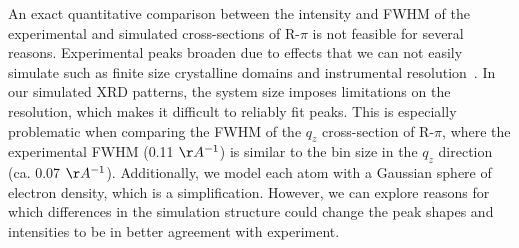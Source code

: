 \documentclass[journal=jpcbfk,manuscript=article]{achemso}
\begin{document}
  An exact quantitative comparison between the intensity and FWHM of the
  experimental and simulated cross-sections of R-$\pi$ is not feasible for
  several reasons. Experimental peaks broaden due to effects that we can not
  easily simulate such as finite size crystalline domains and instrumental %
  resolution~\cite{girolami_x-ray_2016}. In our simulated XRD patterns, 
  the system size imposes limitations
  on the resolution, which makes it difficult to reliably fit peaks. This is
  especially problematic when comparing the FWHM of the $q_z$ cross-section of
  R-$\pi$, where the experimental FWHM (0.11 $\AA^{-1}$) is similar to the bin
  size in the $q_z$ direction (ca. 0.07 $\AA^{-1}$).  Additionally, we model each
  atom with a Gaussian sphere of electron density, which is a simplification.
  However, we can explore reasons for which differences in the simulation
  structure could change the peak shapes and intensities to be in better
  agreement with experiment.


   
\end{document}

